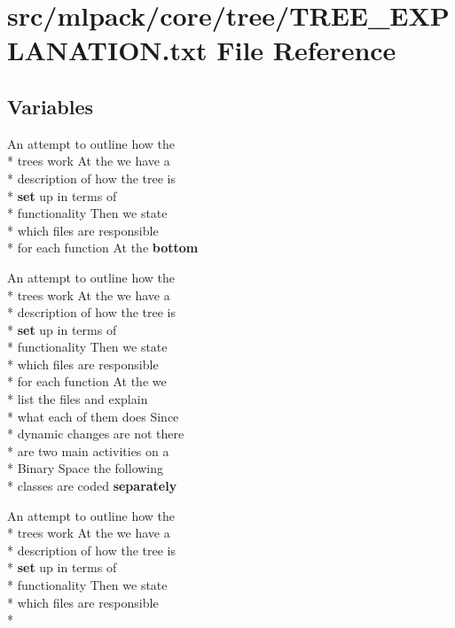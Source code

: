 \section{src/mlpack/core/tree/\-T\-R\-E\-E\-\_\-\-E\-X\-P\-L\-A\-N\-A\-T\-I\-O\-N.txt File Reference}
\label{TREE__EXPLANATION_8txt}
\subsection*{Variables}
\begin{DoxyCompactItemize}
\item 
An attempt to outline how the \\*
trees work At the we have a \\*
description of how the tree is \\*
{\bf set} up in terms of \\*
functionality Then we state \\*
which files are responsible \\*
for each function At the {\bf bottom}
\item 
An attempt to outline how the \\*
trees work At the we have a \\*
description of how the tree is \\*
{\bf set} up in terms of \\*
functionality Then we state \\*
which files are responsible \\*
for each function At the we \\*
list the files and explain \\*
what each of them does Since \\*
dynamic changes are not there \\*
are two main activities on a \\*
Binary Space the following \\*
classes are coded {\bf separately}
\item 
An attempt to outline how the \\*
trees work At the we have a \\*
description of how the tree is \\*
{\bf set} up in terms of \\*
functionality Then we state \\*
which files are responsible \\*

\end{DoxyCompactItemize}
